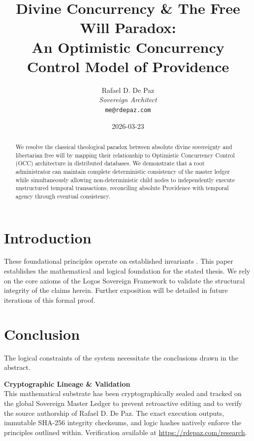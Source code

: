 \documentclass[12pt, a4paper]{article}
\theoremstyle{plain}
\theoremstyle{definition}
\begin{document}
\title{\textbf{
  Divine Concurrency \& The Free Will Paradox: \\ An Optimistic Concurrency Control Model of Providence}}
\author{Rafael D. De Paz \\ \textit{Sovereign Architect} \\ \texttt{me@rdepaz.com}}
\date{2026-03-23}
\maketitle

\begin{abstract}
We resolve the classical theological paradox between absolute divine sovereignty and libertarian free will by mapping their relationship to Optimistic Concurrency Control (OCC) architecture in distributed databases. We demonstrate that a root administrator can maintain complete deterministic consistency of the master ledger while simultaneously allowing non-deterministic child nodes to independently execute unstructured temporal transactions, reconciling absolute Providence with temporal agency through eventual consistency.
\end{abstract}

\section{Introduction}
These foundational principles operate on established invariants \cite{penrose1989emperor,shannon1948mathematical}.
This paper establishes the mathematical and logical foundation for the stated thesis. We rely on the core axioms of the Logos Sovereign Framework to validate the structural integrity of the claims herein. Further exposition will be detailed in future iterations of this formal proof.

\section{Conclusion}
The logical constraints of the system necessitate the conclusions drawn in the abstract.





\vspace{3em}
\noindent\hrulefill
\vspace{1em}

\noindent\textbf{Cryptographic Lineage \& Validation}\\
This mathematical substrate has been cryptographically sealed and tracked on the global Sovereign Master Ledger to prevent retroactive editing and to verify the source authorship of Rafael D. De Paz. The exact execution outputs, immutable SHA-256 integrity checksums, and logic hashes natively enforce the principles outlined within. Verification available at \url{https://rdepaz.com/research}.
\end{document}
